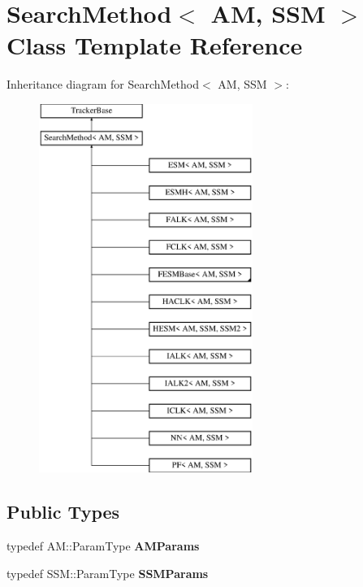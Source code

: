 \hypertarget{classSearchMethod}{\section{Search\-Method$<$ A\-M, S\-S\-M $>$ Class Template Reference}
\label{classSearchMethod}
}
Inheritance diagram for Search\-Method$<$ A\-M, S\-S\-M $>$\-:\begin{figure}[H]
\begin{center}
\leavevmode
\includegraphics[height=12.000000cm]{classSearchMethod}
\end{center}
\end{figure}
\subsection*{Public Types}
\begin{DoxyCompactItemize}
\item 
\hypertarget{classSearchMethod_ae7c5567df31ff8cd7f9d24f9056c2dab}{typedef A\-M\-::\-Param\-Type {\bfseries A\-M\-Params}}\label{classSearchMethod_ae7c5567df31ff8cd7f9d24f9056c2dab}

\item 
\hypertarget{classSearchMethod_a0e04d15f1fdcfba6e40c295bc379b973}{typedef S\-S\-M\-::\-Param\-Type {\bfseries S\-S\-M\-Params}}\label{classSearchMethod_a0e04d15f1fdcfba6e40c295bc379b973}

\end{DoxyCompactItemize}
